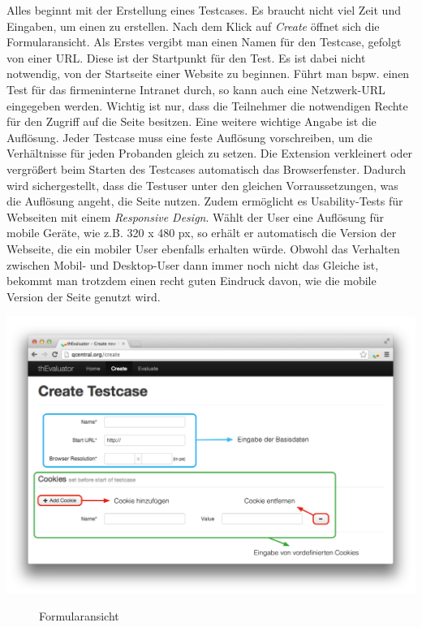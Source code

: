 Alles beginnt mit der Erstellung eines Testcases. Es braucht nicht viel Zeit und Eingaben, um einen zu erstellen. Nach dem Klick auf \textit{Create} öffnet sich die Formularansicht. Als Erstes vergibt man einen Namen für den Testcase, gefolgt von einer URL. Diese ist der Startpunkt für den Test. Es ist dabei nicht notwendig, von der Startseite einer Website zu beginnen. Führt man bspw. einen Test für das firmeninterne Intranet durch, so kann auch eine Netzwerk-URL eingegeben werden. Wichtig ist nur, dass die Teilnehmer die notwendigen Rechte für den Zugriff auf die Seite besitzen. Eine weitere wichtige Angabe ist die Auflösung. Jeder Testcase muss eine feste Auflösung vorschreiben, um die Verhältnisse für jeden Probanden gleich zu setzen. Die Extension verkleinert oder vergrößert beim Starten des Testcases automatisch das Browserfenster. Dadurch wird sichergestellt, dass die Testuser unter den gleichen Vorraussetzungen, was die Auflösung angeht, die Seite nutzen. Zudem ermöglicht es Usability-Tests für Webseiten mit einem \textit{Responsive Design}. Wählt der User eine Auflösung für mobile Geräte, wie z.B. 320 x 480 px, so erhält er automatisch die Version der Webseite, die ein mobiler User ebenfalls erhalten würde. Obwohl das Verhalten zwischen Mobil- und Desktop-User dann immer noch nicht das Gleiche ist, bekommt man trotzdem einen recht guten Eindruck davon, wie die mobile Version der Seite genutzt wird.

\begin{center}
\includegraphics[scale=0.40]{./images/createscreen}
\end{center}
\begin{figure}[htb]
   \centering
   \caption{Formularansicht}
    \label{createview}
\end{figure}

